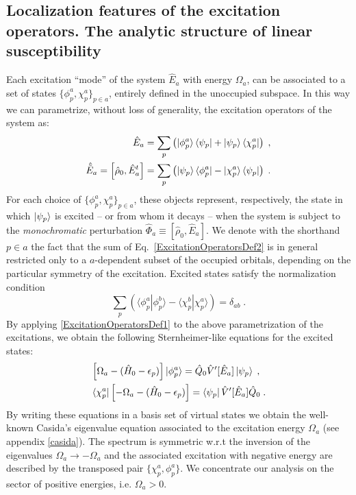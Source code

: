 \documentclass[reprint,aps,prb]{revtex4-1}
\newcommand{\eps}{\epsilon}
\newcommand{\be}{\begin{equation}}
\newcommand{\ee}{\end{equation}}
\newcommand{\nn}{\notag}
\newcommand{\lb}{\label}
\newcommand{\op}[1]{\hat {#1}}
\newcommand{\commutator}[2]{\left[ {#1} , {#2} \right]}
\newcommand{\brket}[2]{\langle  #1 | #2 \rangle} %
\newcommand{\dmnot}{\op{\rho}_0}
\newcommand{\hnot}{\op{H}_0}
\begin{document}

\subsection{Localization features of the excitation operators. The analytic structure of linear susceptibility}

Each excitation ``mode'' of the system $\op E_a$ with energy $\Omega_a$, can be associated to a set of states $\{\phi^a_p,\chi^a_p\}_{p \in a}$,
entirely defined in the unoccupied subspace.
In this way we can parametrize, without loss of generality, the excitation operators of the system as:
\begin{align}\lb{ExcitationOperatorsDef2}
\op E_a &= \sum_p \left( \ket{\phi^a_p}\bra{\psi_p} + \ket{\psi_p} \bra{\chi^a_p}\right)\;, \nn \\
\op{\tilde E}_a = \commutator{\dmnot}{\op E^t_a} &= \sum_p \left( \ket{\psi_p}\bra{\phi^a_p} - \ket{\chi^a_p} \bra{\psi_p}\right)\;.
\end{align}
For each choice of $\{\phi^a_p,\chi^a_p\}_{p \in a}$, these objects represent, respectively, the state in which $\ket{\psi_p}$
is excited -- or from whom it decays -- when the system is subject to the \emph{monochromatic} perturbation $\op \Phi_a \equiv \commutator{\dmnot}{\op E_a}$.
We denote with the shorthand $p \in a$ the fact that the sum of Eq.~\eqref{ExcitationOperatorsDef2}
is in general restricted only to a $a$-dependent subset of the occupied orbitals, depending on the particular symmetry
of the excitation.
Excited states  satisfy the normalization condition
\be\lb{ExcitedStateOrthNormDef1}
\sum_p \left(\brket{\phi_p^a}{\phi_p^b} - \brket{\chi_p^b}{\chi_p^a}\right) = \delta_{ab} \;.
\ee
By applying \eqref{ExcitationOperatorsDef1} to the above parametrization
of the excitations, we obtain the following Sternheimer-like equations for the excited states:
\begin{align}\lb{ExcitationOperatorsDef3}
&\left[\Omega_a-(\hnot - \eps_p)\right] \ket{\phi_p^a} = \op Q_0 \op V'[\op E_a] \ket{\psi_p} \;, \nn\\
&\bra{\chi_p^a}\left[-\Omega_a-(\hnot - \eps_p)\right] = \bra{\psi_p} \op V'[\op E_a] \op Q_0  \;.
\end{align}
By writing these equations in a basis set of virtual states we obtain the well-known Casida's eigenvalue equation\cite{CasidaBook}
associated to the excitation energy $\Omega_a$ (see appendix \ref{casida}).
The spectrum is symmetric w.r.t the inversion of the eigenvalues
$\Omega_a \rightarrow -\Omega_a$ and the associated excitation with negative energy are described by the transposed pair $\{\chi^a_p,\phi^a_p\}$.
We concentrate our analysis on the sector of positive energies, i.e. $\Omega_a > 0$.
\end{document}
